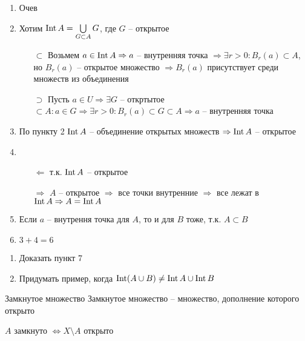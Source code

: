 \documentclass[12pt]{article}
\begin{document}
\begin{enumerate}
    \item Очев 
    \item Хотим $\operatorname{Int} A = \bigcup\limits_{G \subset A} G$, где $G$ -- открытое
    
    \begin{itemize}
        \item[$\subset$] Возьмем $a \in \operatorname{Int} A \Rightarrow a$ -- внутренняя точка $\Rightarrow \exists r > 0 : B_r(a) \subset A$, но $B_r(a)$ -- открытое множество $\Rightarrow B_r(a)$ присутствует среди множеств из объединения
        \item[$\supset$] Пусть $a \in U \Rightarrow \exists G$ -- откртытое $\subset A : a \in G \Rightarrow \exists r > 0 : B_r(a) \subset G \subset A \Rightarrow a$ -- внутренняя точка 
    \end{itemize}

    \item По пункту 2 $\operatorname{Int} A$ -- объединение открытых множеств $\Rightarrow \operatorname{Int} A$ -- открытое
    
    \item 
    
    \begin{itemize}
        \item[$\Leftarrow$] т.к. $\operatorname{Int} A$ -- открытое
        \item[$\Rightarrow$] $A$ -- открытое $\Rightarrow$ все точки внутренние $\Rightarrow$ все лежат в $\operatorname{Int} A \Rightarrow A = \operatorname{Int} A$
    \end{itemize}

    \item Если $a$ -- внутрення точка для $A$, то и для $B$ тоже, т.к. $A \subset B$
    \item $3 + 4 = 6$
\end{enumerate}

\begin{Exercise}{}
    \begin{enumerate}
        \item Доказать пункт 7
        \item Придумать пример, когда $\operatorname{Int} (A \cup B) \neq \operatorname{Int} A \cup \operatorname{Int} B$
    \end{enumerate}
\end{Exercise}

\begin{defin}{Замкнутое множество}
    Замкнутое множество -- множество, дополнение которого открыто 

    $A$ замкнуто $\Leftrightarrow X \setminus A$ открыто
\end{defin}
\end{document}
